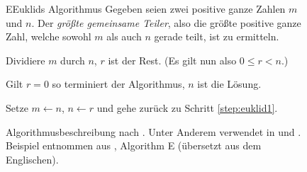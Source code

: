 \begin{figure}[hbt]
    \hspace{0.095\textwidth}
    \begin{minipage}[c]{0.8\textwidth}
        \begin{algo}{E}{Euklids Algorithmus}
            Gegeben seien zwei positive ganze Zahlen $m$ und $n$. Der \emph{größte gemeinsame Teiler}, also die größte positive ganze Zahl, welche sowohl $m$ als auch $n$ gerade teilt, ist zu ermitteln.
        
            \begin{algosteps}
                 Dividiere $m$ durch $n$, $r$ ist der Rest. (Es gilt nun also $0 \leq r < n$.)\label{step:euklid1}
        
                 Gilt $r = 0$ so terminiert der Algorithmus, $n$ ist die Lösung.\label{step:euklid2}
                
                \algostep[Verringere.] Setze $m \leftarrow n$, $n \leftarrow r$ und gehe zurück zu Schritt \ref{step:euklid1}\label{step:euklid3}.
            \end{algosteps}
        \end{algo}
    \end{minipage}
    \caption{Algorithmusbeschreibung nach \citeauthor{taocp1}. Unter Anderem verwendet in \cite{taocp1} und \cite{taocp3}. Beispiel entnommen aus \cite[2]{taocp1}, Algorithm E (übersetzt aus dem Englischen).}
    \label{fig:knuth-algorithm-specification}
\end{figure}

